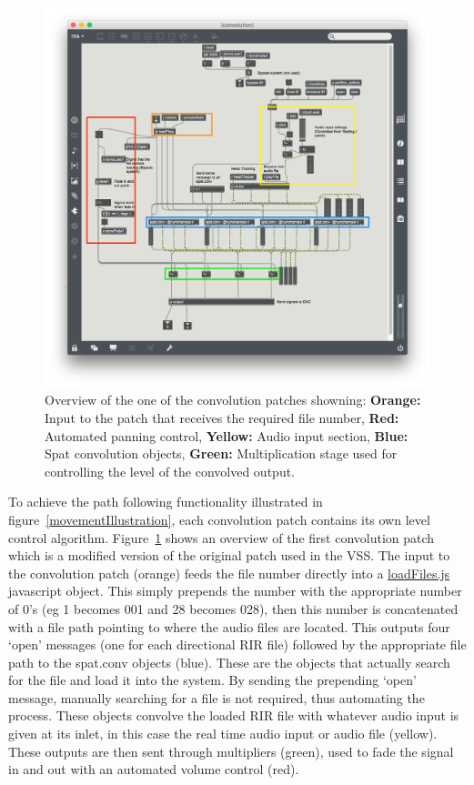 \documentclass[../../main.tex]{subfiles}
\begin{document}
			\begin{figure}[t]
				\centerline{\includegraphics[scale = 0.4]{Sections/Implementation/Max/images/Max/Iteration3/convPatch_edit.png}}
				\caption{Overview of the one of the convolution patches showning: \textbf{Orange:} Input to the patch that receives the required file number, \textbf{Red:} Automated panning control, \textbf{Yellow:} Audio input section, \textbf{Blue:} Spat convolution objects, \textbf{Green:} Multiplication stage used for controlling the level of the convolved output.}
				\label{convPatch}
			\end{figure}

			To achieve the path following functionality illustrated in figure~\ref{movementIllustration}, each convolution patch contains its own level control algorithm. Figure~\ref{convPatch} shows an overview of the first convolution patch which is a modified version of the original patch used in the \ac{VSS}. The input to the convolution patch (orange) feeds the file number directly into a \href{http://lt669.github.io/code/javascript/html/loadFiles.html}{loadFiles.js} javascript object. This simply prepends the number with the appropriate number of 0's (eg 1 becomes 001 and 28 becomes 028), then this number is concatenated with a file path pointing to where the audio files are located. This outputs four `open' messages (one for each directional \ac{RIR} file)  followed by the appropriate file path to the spat.conv objects (blue). These are the objects that actually search for the file and load it into the system. By sending the prepending `open' message, manually searching for a file is not required, thus automating the process. These objects convolve the loaded \ac{RIR} file with whatever audio input is given at its inlet, in this case the real time audio input or audio file (yellow). These outputs are then sent through multipliers (green), used to fade the signal in and out with an automated volume control (red).
		 	
\end{document}
